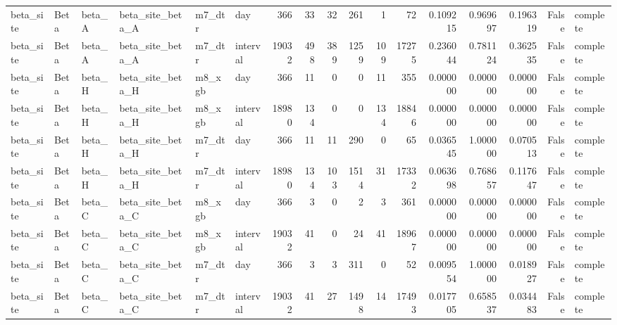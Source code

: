 \begin{tabular}{llllllrrrrrrrrrrl}
beta_site & Beta & beta_A & beta_site_beta_A & m7_dtr & day & 366 & 33 & 32 & 261 & 1 & 72 & 0.109215 & 0.969697 & 0.196319 & False & complete \\
beta_site & Beta & beta_A & beta_site_beta_A & m7_dtr & interval & 19032 & 498 & 389 & 1259 & 109 & 17275 & 0.236044 & 0.781124 & 0.362535 & False & complete \\
beta_site & Beta & beta_H & beta_site_beta_H & m8_xgb & day & 366 & 11 & 0 & 0 & 11 & 355 & 0.000000 & 0.000000 & 0.000000 & False & complete \\
beta_site & Beta & beta_H & beta_site_beta_H & m8_xgb & interval & 18980 & 134 & 0 & 0 & 134 & 18846 & 0.000000 & 0.000000 & 0.000000 & False & complete \\
beta_site & Beta & beta_H & beta_site_beta_H & m7_dtr & day & 366 & 11 & 11 & 290 & 0 & 65 & 0.036545 & 1.000000 & 0.070513 & False & complete \\
beta_site & Beta & beta_H & beta_site_beta_H & m7_dtr & interval & 18980 & 134 & 103 & 1514 & 31 & 17332 & 0.063698 & 0.768657 & 0.117647 & False & complete \\
beta_site & Beta & beta_C & beta_site_beta_C & m8_xgb & day & 366 & 3 & 0 & 2 & 3 & 361 & 0.000000 & 0.000000 & 0.000000 & False & complete \\
beta_site & Beta & beta_C & beta_site_beta_C & m8_xgb & interval & 19032 & 41 & 0 & 24 & 41 & 18967 & 0.000000 & 0.000000 & 0.000000 & False & complete \\
beta_site & Beta & beta_C & beta_site_beta_C & m7_dtr & day & 366 & 3 & 3 & 311 & 0 & 52 & 0.009554 & 1.000000 & 0.018927 & False & complete \\
beta_site & Beta & beta_C & beta_site_beta_C & m7_dtr & interval & 19032 & 41 & 27 & 1498 & 14 & 17493 & 0.017705 & 0.658537 & 0.034483 & False & complete \\
\bottomrule
\end{tabular}
